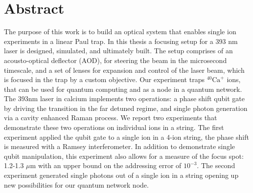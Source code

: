 \documentclass[english, a4paper, 12pt, twoside]{book}
\numberwithin{equation}{section} %
\begin{document}
{

}
\restoregeometry %

\thispagestyle{plain} %
\clearpage\mbox{}\clearpage %

\newpage

\section*{Abstract}
The purpose of this work is to build an optical system that enables single ion experiments in a linear Paul trap.
In this thesis a focusing setup for a 393 nm laser is designed, simulated, and ultimately built. The setup comprises of an acousto-optical deflector (AOD), for steering the beam in the microsecond timescale, and a set of lenses for expansion and control of the laser beam, which is focused in the trap by a custom objective. Our experiment traps $^{40}\text{Ca}^+$ ions, that can be used for quantum computing and as a node in a quantum network. The 393nm laser in calcium implements two operations: a phase shift qubit gate by driving the transition in the far detuned regime, and single photon generation via a cavity enhanced Raman process. We report two experiments that demonstrate these two operations on individual ions in a string. The first experiment applied the qubit gate to a single ion in a 4-ion string, the phase shift is measured with a Ramsey interferometer. In addition to demonstrate single qubit manipulation, this experiment also allows for a measure of the focus spot: 1.2-1.3 $\mu$m with an upper bound on the addressing error of $10^{-3}$. The second experiment generated single photons out of a single ion in a string opening up new possibilities for our quantum network node.
\newpage


\newpage
\tableofcontents


\newpage
{} %
\setcounter{page}{1} %
\end{document}
